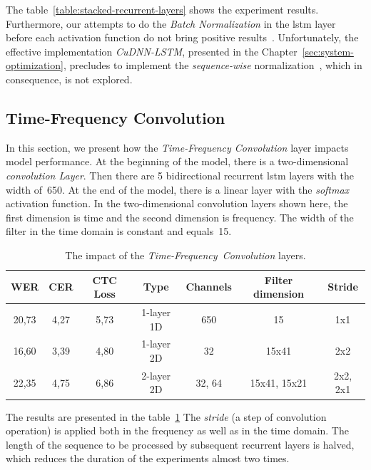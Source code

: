 The table~\ref{table:stacked-recurrent-layers} shows the experiment results.
Furthermore, our attempts to do the \textit{Batch Normalization} in the \acrshort{lstm} layer
before each activation function do not bring positive results~\cite{amodei2015}.
Unfortunately, the effective implementation \textit{CuDNN-LSTM}, presented in the Chapter~\ref{sec:system-optimization},
precludes to implement the \textit{sequence-wise} normalization~\cite{laurent2015}, which in consequence, is not explored.


\subsection*{Time-Frequency Convolution}

In this section, we present how the \textit{Time-Frequency Convolution} layer impacts model performance.
At the beginning of the model, there is a two-dimensional \textit{convolution Layer}.
Then there are 5 bidirectional recurrent \acrshort{lstm} layers with the width of~650.
At the end of the model, there is a linear layer with the \textit{softmax} activation function.
In the two-dimensional convolution layers shown here, the first dimension is time and
the second dimension is frequency.
The width of the filter in the time domain is constant and equals~15.

\begin{table}[h!]
\vspace*{10pt}
\centering
 \begin{tabular}{c c c c c c c}
  \toprule
    WER & CER & CTC Loss & Type	& Channels	& Filter dimension	& Stride \\
   \midrule
    20,73 & 4,27 & 5,73	& 1-layer 1D & 650	        & 15	        & 1x1       \\
  \midrule
    16,60 & 3,39 & 4,80	& 1-layer 2D & 32	        & 15x41	        & 2x2       \\
    22,35 & 4,75 & 6,86	& 2-layer 2D & 32, 64	    & 15x41, 15x21	& 2x2, 2x1  \\
  \bottomrule
 \end{tabular}
\caption{
The impact of the \textit{Time-Frequency~Convolution} layers.
}
\label{table:time-frequency-convolution}
\end{table}

The results are presented in the table~\ref{table:time-frequency-convolution}
The \textit{stride} (a step of convolution operation) is applied
both in the frequency as well as in the time domain.
The length of the sequence to be processed by subsequent recurrent layers is halved,
which reduces the duration of the experiments almost two times.


